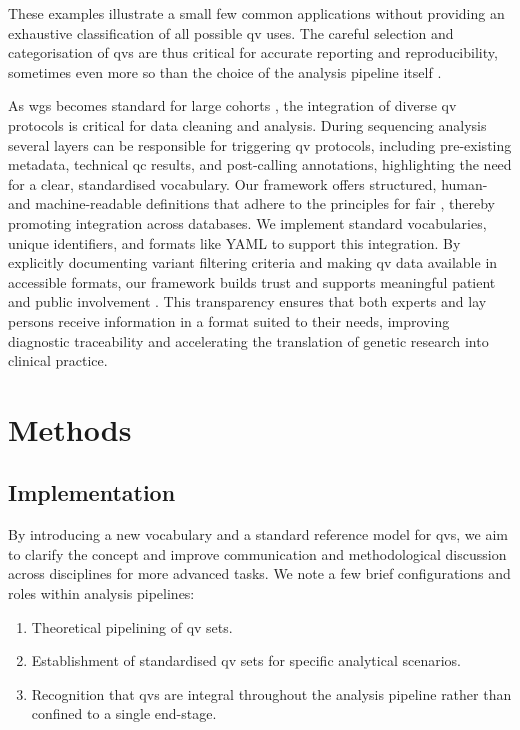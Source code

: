  These examples illustrate a small few common applications without providing an exhaustive classification of all possible \ac{qv} uses.
The careful selection and categorisation of \ac{qv}s are thus critical for accurate reporting and reproducibility, sometimes even more so than the choice of the analysis pipeline itself \cite{olson2023variant}.

As \ac{wgs} becomes standard for large cohorts \cite{lee2018gene, jansen2019genome}, the integration of diverse \ac{qv} protocols is critical for data cleaning and analysis. 
During sequencing analysis several layers can be responsible for triggering \ac{qv} protocols, including
pre-existing metadata, technical \ac{qc} results, and post-calling annotations,
highlighting the need for a clear, standardised vocabulary. Our framework offers structured, human- and machine-readable definitions that adhere to the principles for  \ac{fair} \cite{wilkinson2016fair}, thereby promoting  integration across databases. 
We implement standard vocabularies, unique identifiers, and formats like YAML to support this integration.
By explicitly documenting variant filtering criteria and making \ac{qv} data available in accessible formats, our framework builds trust and supports meaningful patient and public involvement \cite{morris_answer_2011}. This transparency ensures that both experts and lay persons receive information in a format suited to their needs, improving diagnostic traceability and accelerating the translation of genetic research into clinical practice.

\section{Methods}
\subsection{Implementation} \label{sec:framework}

By introducing a new vocabulary and a standard reference model for \ac{qv}s, we aim to clarify the concept and improve communication and methodological discussion across disciplines for more advanced tasks.
We note a few brief configurations and roles within analysis pipelines:
\begin{enumerate}
    \item Theoretical pipelining of \ac{qv} sets.
    \item Establishment of standardised \ac{qv} sets for specific analytical scenarios.
    \item Recognition that \ac{qv}s are integral throughout the analysis pipeline rather than confined to a single end-stage.
\end{enumerate}

